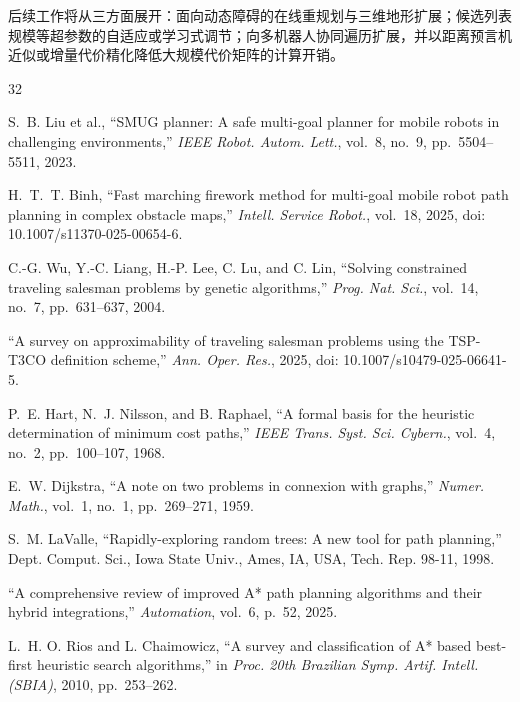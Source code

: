 \documentclass[lettersize,journal]{IEEEtran}
\begin{document}
后续工作将从三方面展开：面向动态障碍的在线重规划与三维地形扩展；候选列表规模等超参数的自适应或学习式调节；向多机器人协同遍历扩展，并以距离预言机近似或增量代价精化降低大规模代价矩阵的计算开销。

\begin{thebibliography}{32}


S.~B. Liu et al., ``SMUG planner: A safe multi-goal planner for mobile robots in challenging environments,'' \textit{IEEE Robot. Autom. Lett.}, vol.~8, no.~9, pp.~5504--5511, 2023.


H.~T.~T. Binh, ``Fast marching firework method for multi-goal mobile robot path planning in complex obstacle maps,'' \textit{Intell. Service Robot.}, vol.~18, 2025, doi: 10.1007/s11370-025-00654-6.


C.-G. Wu, Y.-C. Liang, H.-P. Lee, C. Lu, and C. Lin, ``Solving constrained traveling salesman problems by genetic algorithms,'' \textit{Prog. Nat. Sci.}, vol.~14, no.~7, pp.~631--637, 2004.


``A survey on approximability of traveling salesman problems using the TSP-T3CO definition scheme,'' \textit{Ann. Oper. Res.}, 2025, doi: 10.1007/s10479-025-06641-5.


P.~E. Hart, N.~J. Nilsson, and B. Raphael, ``A formal basis for the heuristic determination of minimum cost paths,'' \textit{IEEE Trans. Syst. Sci. Cybern.}, vol.~4, no.~2, pp.~100--107, 1968.


E.~W. Dijkstra, ``A note on two problems in connexion with graphs,'' \textit{Numer. Math.}, vol.~1, no.~1, pp.~269--271, 1959.


S.~M. LaValle, ``Rapidly-exploring random trees: A new tool for path planning,'' Dept. Comput. Sci., Iowa State Univ., Ames, IA, USA, Tech. Rep. 98-11, 1998.


``A comprehensive review of improved A* path planning algorithms and their hybrid integrations,'' \textit{Automation}, vol.~6, p.~52, 2025.


L.~H. O. Rios and L. Chaimowicz, ``A survey and classification of A* based best-first heuristic search algorithms,'' in \textit{Proc. 20th Brazilian Symp. Artif. Intell. (SBIA)}, 2010, pp.~253--262.


\end{thebibliography}
\end{document}
